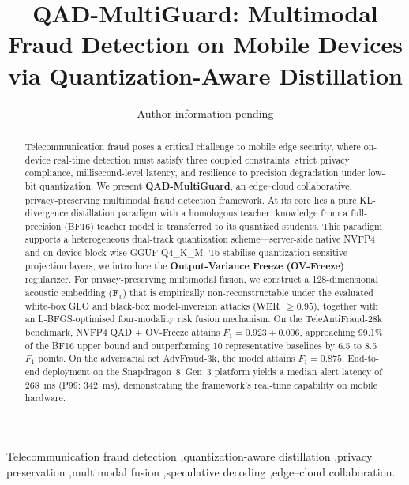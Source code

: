 \documentclass[final,5p,times,number]{elsarticle}
\begin{document}
\begin{frontmatter}

\title{QAD-MultiGuard: Multimodal Fraud Detection on Mobile Devices via Quantization-Aware Distillation}

\author{Author information pending}


\begin{abstract}
Telecommunication fraud poses a critical challenge to mobile edge security, where on-device real-time detection must satisfy three coupled constraints: strict privacy compliance, millisecond-level latency, and resilience to precision degradation under low-bit quantization. We present \textbf{QAD-MultiGuard}, an edge--cloud collaborative, privacy-preserving multimodal fraud detection framework. At its core lies a pure KL-divergence distillation paradigm with a homologous teacher: knowledge from a full-precision (BF16) teacher model is transferred to its quantized students. This paradigm supports a heterogeneous dual-track quantization scheme---server-side native NVFP4 and on-device block-wise GGUF-Q4\_K\_M. To stabilise quantization-sensitive projection layers, we introduce the \textbf{Output-Variance Freeze (OV-Freeze)} regularizer. For privacy-preserving multimodal fusion, we construct a 128-dimensional acoustic embedding ($\bm{F}_v$) that is empirically non-reconstructable under the evaluated white-box GLO and black-box model-inversion attacks (WER~$\ge 0.95$), together with an L-BFGS-optimised four-modality risk fusion mechanism. On the TeleAntiFraud-28k benchmark, NVFP4 QAD + OV-Freeze attains $F_1 = 0.923 \pm 0.006$, approaching 99.1\% of the BF16 upper bound and outperforming 10 representative baselines by 6.5 to 8.5 $F_1$ points. On the adversarial set AdvFraud-3k, the model attains $F_1 = 0.875$. End-to-end deployment on the Snapdragon~8~Gen~3 platform yields a median alert latency of 268~ms (P99: 342~ms), demonstrating the framework's real-time capability on mobile hardware.
\end{abstract}

\begin{keyword}
Telecommunication fraud detection \sep quantization-aware distillation \sep privacy preservation \sep multimodal fusion \sep speculative decoding \sep edge--cloud collaboration.
\end{keyword}

\end{frontmatter}
\end{document}
